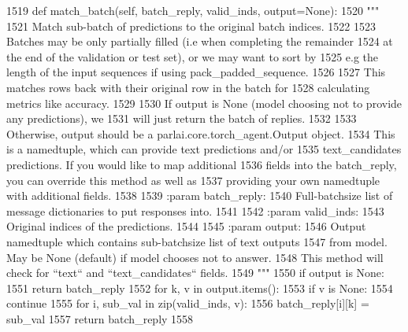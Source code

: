 \begin{DoxyCode}
1519     \textcolor{keyword}{def }match\_batch(self, batch\_reply, valid\_inds, output=None):
1520         \textcolor{stringliteral}{"""}
1521 \textcolor{stringliteral}{        Match sub-batch of predictions to the original batch indices.}
1522 \textcolor{stringliteral}{}
1523 \textcolor{stringliteral}{        Batches may be only partially filled (i.e when completing the remainder}
1524 \textcolor{stringliteral}{        at the end of the validation or test set), or we may want to sort by}
1525 \textcolor{stringliteral}{        e.g the length of the input sequences if using pack\_padded\_sequence.}
1526 \textcolor{stringliteral}{}
1527 \textcolor{stringliteral}{        This matches rows back with their original row in the batch for}
1528 \textcolor{stringliteral}{        calculating metrics like accuracy.}
1529 \textcolor{stringliteral}{}
1530 \textcolor{stringliteral}{        If output is None (model choosing not to provide any predictions), we}
1531 \textcolor{stringliteral}{        will just return the batch of replies.}
1532 \textcolor{stringliteral}{}
1533 \textcolor{stringliteral}{        Otherwise, output should be a parlai.core.torch\_agent.Output object.}
1534 \textcolor{stringliteral}{        This is a namedtuple, which can provide text predictions and/or}
1535 \textcolor{stringliteral}{        text\_candidates predictions. If you would like to map additional}
1536 \textcolor{stringliteral}{        fields into the batch\_reply, you can override this method as well as}
1537 \textcolor{stringliteral}{        providing your own namedtuple with additional fields.}
1538 \textcolor{stringliteral}{}
1539 \textcolor{stringliteral}{        :param batch\_reply:}
1540 \textcolor{stringliteral}{            Full-batchsize list of message dictionaries to put responses into.}
1541 \textcolor{stringliteral}{}
1542 \textcolor{stringliteral}{        :param valid\_inds:}
1543 \textcolor{stringliteral}{            Original indices of the predictions.}
1544 \textcolor{stringliteral}{}
1545 \textcolor{stringliteral}{        :param output:}
1546 \textcolor{stringliteral}{            Output namedtuple which contains sub-batchsize list of text outputs}
1547 \textcolor{stringliteral}{            from model. May be None (default) if model chooses not to answer.}
1548 \textcolor{stringliteral}{            This method will check for ``text`` and ``text\_candidates`` fields.}
1549 \textcolor{stringliteral}{        """}
1550         \textcolor{keywordflow}{if} output \textcolor{keywordflow}{is} \textcolor{keywordtype}{None}:
1551             \textcolor{keywordflow}{return} batch\_reply
1552         \textcolor{keywordflow}{for} k, v \textcolor{keywordflow}{in} output.items():
1553             \textcolor{keywordflow}{if} v \textcolor{keywordflow}{is} \textcolor{keywordtype}{None}:
1554                 \textcolor{keywordflow}{continue}
1555             \textcolor{keywordflow}{for} i, sub\_val \textcolor{keywordflow}{in} zip(valid\_inds, v):
1556                 batch\_reply[i][k] = sub\_val
1557         \textcolor{keywordflow}{return} batch\_reply
1558 
\end{DoxyCode}
